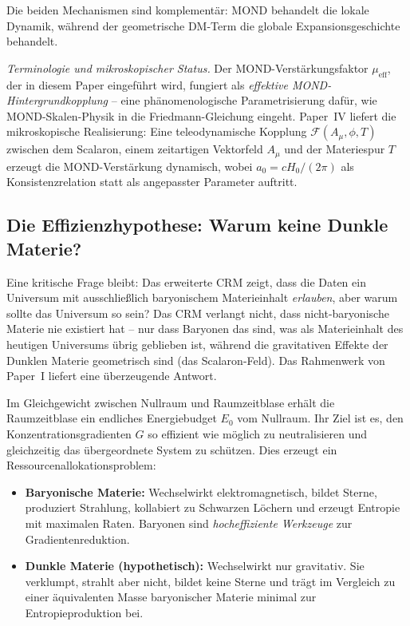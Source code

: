 \documentclass[aps,prd,twocolumn,superscriptaddress,nofootinbib]{revtex4-2}
\begin{document}
Die beiden Mechanismen sind komplement\"ar: MOND behandelt die lokale Dynamik, w\"ahrend der geometrische DM-Term die globale Expansionsgeschichte behandelt.

\textit{Terminologie und mikroskopischer Status.} Der MOND-Verst\"arkungsfaktor $\mu_{\mathrm{eff}}$, der in diesem Paper eingef\"uhrt wird, fungiert als \emph{effektive MOND-Hintergrundkopplung} -- eine ph\"anomenologische Parametrisierung daf\"ur, wie MOND-Skalen-Physik in die Friedmann-Gleichung eingeht. Paper~IV \cite{Geiger2026d} liefert die mikroskopische Realisierung: Eine teleodynamische Kopplung $\mathcal{F}(A_\mu, \phi, T)$ zwischen dem Scalaron, einem zeitartigen Vektorfeld $A_\mu$ und der Materiespur $T$ erzeugt die MOND-Verst\"arkung dynamisch, wobei $a_0 = cH_0/(2\pi)$ als Konsistenzrelation statt als angepasster Parameter auftritt.

\subsection{Die Effizienzhypothese: Warum keine Dunkle Materie?}
\label{subsec:efficiency}

Eine kritische Frage bleibt: Das erweiterte CRM zeigt, dass die Daten ein Universum mit ausschließlich baryonischem Materieinhalt \textit{erlauben}, aber warum sollte das Universum so sein? Das CRM verlangt nicht, dass nicht-baryonische Materie nie existiert hat -- nur dass Baryonen das sind, was als Materieinhalt des heutigen Universums \"ubrig geblieben ist, w\"ahrend die gravitativen Effekte der Dunklen Materie geometrisch sind (das Scalaron-Feld). Das Rahmenwerk von Paper~I liefert eine \"uberzeugende Antwort.

Im Gleichgewicht zwischen Nullraum und Raumzeitblase \cite{Geiger2026} erh\"alt die Raumzeitblase ein endliches Energiebudget $E_0$ vom Nullraum. Ihr Ziel ist es, den Konzentrationsgradienten $G$ so effizient wie m\"oglich zu neutralisieren und gleichzeitig das \"ubergeordnete System zu sch\"utzen. Dies erzeugt ein Ressourcenallokationsproblem:

\begin{itemize}
\item \textbf{Baryonische Materie:} Wechselwirkt elektromagnetisch, bildet Sterne, produziert Strahlung, kollabiert zu Schwarzen L\"ochern und erzeugt Entropie mit maximalen Raten. Baryonen sind \textit{hocheffiziente Werkzeuge} zur Gradientenreduktion.

\item \textbf{Dunkle Materie (hypothetisch):} Wechselwirkt nur gravitativ. Sie verklumpt, strahlt aber nicht, bildet keine Sterne und tr\"agt im Vergleich zu einer \"aquivalenten Masse baryonischer Materie minimal zur Entropieproduktion bei.
\end{itemize}
\end{document}
